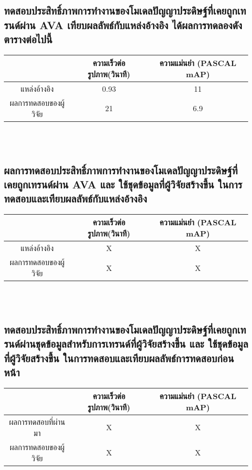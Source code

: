 \subsection{ทดสอบประสิทธิ์ภาพการทำงานของโมเดลปัญญาประดิษฐ์ที่เคยถูกเทรนด์ผ่าน AVA เทียบผลลัพธ์กับแหล่งอ้างอิง ได้ผลการทดลองดังตารางต่อไปนี้}
\begin{tabular}{|c|c|c|}
		\hline
		{}&{ความเร็วต่อรูปภาพ(วินาที)}&{ความแม่นยำ (PASCAL mAP)}			\\
		\hline
		แหล่งอ้างอิง	 					& 0.93		& 11														\\
		ผลการทดสอบของผู้วิจัย				& 21			& 6.9				\\
		\hline
\end{tabular}
\\\\
\subsection{ผลการทดสอบประสิทธิ์ภาพการทำงานของโมเดลปัญญาประดิษฐ์ที่เคยถูกเทรนด์ผ่าน AVA และ ใช้ชุดข้อมูลที่ผู้วิจัยสร้างขึ้น ในการทดสอบและเทียบผลลัพธ์กับแหล่งอ้างอิง}
\begin{tabular}{|c|c|c|}
		\hline
		{}&{ความเร็วต่อรูปภาพ(วินาที)}&{ความแม่นยำ (PASCAL mAP)}			\\
		\hline
		แหล่งอ้างอิง	 					& X			& X														\\
		ผลการทดสอบของผู้วิจัย				& X			& X				\\
		\hline
\end{tabular}
\\\\
\subsection{ทดสอบประสิทธิ์ภาพการทำงานของโมเดลปัญญาประดิษฐ์ที่เคยถูกเทรนด์ผ่านชุดข้อมูลสำหรับการเทรนด์ที่ผู้วิจัยสร้างขึ้น และ ใช้ชุดข้อมูลที่ผู้วิจัยสร้างขึ้น ในการทดสอบและเทียบผลลัพธ์การทดสอบก่อนหน้า}
\begin{tabular}{|c|c|c|}
		\hline
		{}&{ความเร็วต่อรูปภาพ(วินาที)}&{ความแม่นยำ (PASCAL mAP)}			\\
		\hline
		ผลการทดสอบที่ผ่านมา	 				& X			& X					\\
		ผลการทดสอบของผู้วิจัย				& X			& X				\\
		\hline
\end{tabular}
